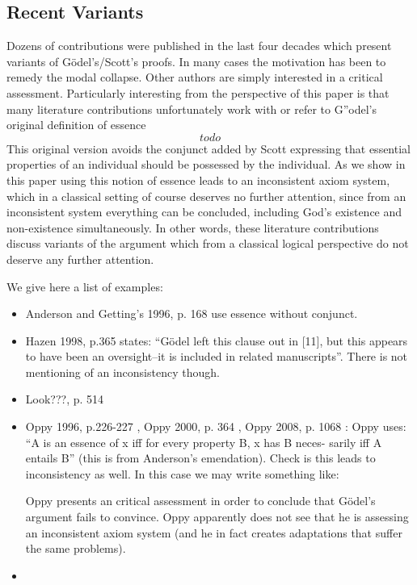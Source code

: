 \documentclass{article}
\begin{document}
\subsection{Recent Variants}
Dozens of contributions were published in the last four decades which
present variants of G\"odel's/Scott's proofs. In many cases the
motivation has been to remedy the modal collapse. Other authors are
simply interested in a critical assessment. Particularly interesting
from the perspective of this paper is that many literature
contributions unfortunately work with or refer to G''odel's original
definition of essence
$$ todo $$
This original version avoids the conjunct added by Scott expressing
that essential properties of an individual should be possessed by the
individual. As we show in this paper using this notion of essence
leads to an inconsistent axiom system, which in a classical setting of
course deserves no further attention, since from an inconsistent
system everything can be concluded, including God's existence and
non-existence simultaneously. In other words, these literature
contributions discuss variants of the argument which from a classical
logical perspective do not deserve any further attention.

We give here a list of examples:
\begin{itemize}
\item Anderson and Getting's 1996, p. 168 \cite[p.168]{AndersonGettings1968}
  use essence without conjunct.
\item  Hazen 1998, p.365 \cite[p.365]{Hazen1998} states: ``G\"odel left this
  clause out in [11], but this appears to have been an oversight--it
  is included in related manuscripts''. There is not mentioning of an
  inconsistency though.
\item Look???, p. 514
\item Oppy 1996, p.226-227 \cite[p.226/227]{Oppy1996}, Oppy 2000, p. 364
  \cite[p.364]{Oppy200}, Oppy 2008, p. 1068 \cite[p.1068]{Oppy2008}:
  Oppy uses: ``A is an essence of x iff for every property B, x has B
  neces- sarily iff A entails B'' (this is from Anderson's
  emendation). Check is this leads to inconsistency as well. In this
  case we may write something like: 

 Oppy presents an critical
  assessment in order to conclude that G\"odel's argument fails to
  convince. Oppy apparently does not see that he is assessing an
  inconsistent axiom system (and he in fact creates adaptations that
  suffer the same problems).
\item 
\end{itemize}
\end{document}
